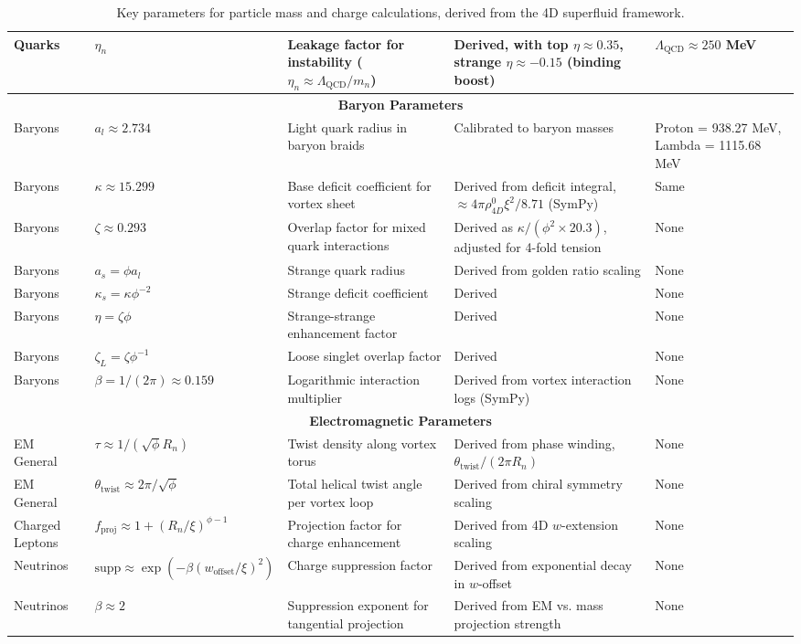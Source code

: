 \begin{sidewaystable}[p]
\begin{tabularx}{\linewidth}{|p{2cm}|p{3cm}|X|X|p{3cm}|}
Quarks & $\eta_n$ & Leakage factor for instability ($\eta_n \approx \Lambda_{\text{QCD}} / m_n$) & Derived, with top $\eta \approx 0.35$, strange $\eta \approx -0.15$ (binding boost) & $\Lambda_{\text{QCD}} \approx 250$ MeV \\
\hline
\multicolumn{5}{|c|}{\textbf{Baryon Parameters}} \\
\hline
Baryons & $a_l \approx 2.734$ & Light quark radius in baryon braids & Calibrated to baryon masses & Proton = 938.27 MeV, Lambda = 1115.68 MeV \\
Baryons & $\kappa \approx 15.299$ & Base deficit coefficient for vortex sheet & Derived from deficit integral, $\approx 4 \pi \rho_{4D}^0 \xi^2 / 8.71$ (SymPy) & Same \\
Baryons & $\zeta \approx 0.293$ & Overlap factor for mixed quark interactions & Derived as $\kappa / (\phi^2 \times 20.3)$, adjusted for 4-fold tension & None \\
Baryons & $a_s = \phi a_l$ & Strange quark radius & Derived from golden ratio scaling & None \\
Baryons & $\kappa_s = \kappa \phi^{-2}$ & Strange deficit coefficient & Derived & None \\
Baryons & $\eta = \zeta \phi$ & Strange-strange enhancement factor & Derived & None \\
Baryons & $\zeta_L = \zeta \phi^{-1}$ & Loose singlet overlap factor & Derived & None \\
Baryons & $\beta = 1/(2\pi) \approx 0.159$ & Logarithmic interaction multiplier & Derived from vortex interaction logs (SymPy) & None \\
\hline
\multicolumn{5}{|c|}{\textbf{Electromagnetic Parameters}} \\
\hline
EM General & $\tau \approx 1 / (\sqrt{\phi} R_n)$ & Twist density along vortex torus & Derived from phase winding, $\theta_{\text{twist}} / (2\pi R_n)$ & None \\
EM General & $\theta_{\text{twist}} \approx 2\pi / \sqrt{\phi}$ & Total helical twist angle per vortex loop & Derived from chiral symmetry scaling & None \\
Charged Leptons & $f_{\text{proj}} \approx 1 + (R_n / \xi)^{\phi - 1}$ & Projection factor for charge enhancement & Derived from 4D $w$-extension scaling & None \\
Neutrinos & $\text{supp} \approx \exp( - \beta (w_{\text{offset}} / \xi)^2 )$ & Charge suppression factor & Derived from exponential decay in $w$-offset & None \\
Neutrinos & $\beta \approx 2$ & Suppression exponent for tangential projection & Derived from EM vs. mass projection strength & None \\
\hline
\end{tabularx}
\caption{Key parameters for particle mass and charge calculations, derived from the 4D superfluid framework.}
\label{tab:variables}
\end{sidewaystable}

